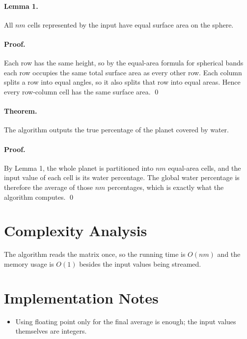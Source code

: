 \documentclass[11pt]{article}
\begin{document}
\paragraph{Lemma 1.}
All $nm$ cells represented by the input have equal surface area on the sphere.

\paragraph{Proof.}
Each row has the same height, so by the equal-area formula for spherical bands each row occupies the
same total surface area as every other row. Each column splits a row into equal angles, so it also splits
that row into equal areas. Hence every row-column cell has the same surface area. \qed

\paragraph{Theorem.}
The algorithm outputs the true percentage of the planet covered by water.

\paragraph{Proof.}
By Lemma 1, the whole planet is partitioned into $nm$ equal-area cells, and the input value of each cell is
its water percentage. The global water percentage is therefore the average of those $nm$ percentages,
which is exactly what the algorithm computes. \qed

\section*{Complexity Analysis}

The algorithm reads the matrix once, so the running time is $O(nm)$ and the memory usage is $O(1)$
besides the input values being streamed.

\section*{Implementation Notes}

\begin{itemize}[leftmargin=*]
    \item Using floating point only for the final average is enough; the input values themselves are integers.
\end{itemize}
\end{document}
